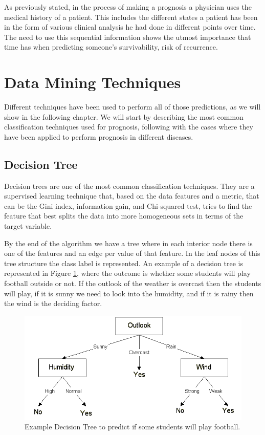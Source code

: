 As previously stated, in the process of making a prognosis a physician uses the medical history of a patient. This includes the different states 
a patient has been in the form of various clinical analysis he had done in different points over time. The need to use this sequential information 
shows the utmost importance that time has when predicting someone’s survivability, risk of recurrence.

\section{Data Mining Techniques}
\label{section:dataminingtech}

Different techniques have been used to perform all of those predictions, as we will show in the following chapter.
 We will start by describing the most common classification techniques used for prognosis, following with the cases 
 where they have been applied to perform prognosis in different diseases.

\subsection{Decision Tree}
\label{subsection:dt}

Decision trees are one of the most common classification techniques. They are a supervised learning technique that, based on the data
 features and a metric, that can be the Gini index, information gain, and Chi-squared test, tries to find the feature that best splits 
 the data into more homogeneous sets in terms of the target variable. 

By the end of the algorithm we have a tree where in each interior node there is one of the features and an edge per value of that 
feature. In the leaf nodes of this tree structure the class label is represented. An example of a decision tree is represented in Figure \ref{fig:dt}, where the outcome is whether some students will play football outside or not. If the outlook of the weather is overcast then the students will play, if it is sunny we need to look into the humidity, and if it is rainy then the wind is the deciding factor. 

\begin{figure}[!htb]
  \centering
  \includegraphics[width=1\textwidth]{Figures/dt.png}
  \caption{Example Decision Tree to predict if some students will play football.}
  \label{fig:dt}
\end{figure}

